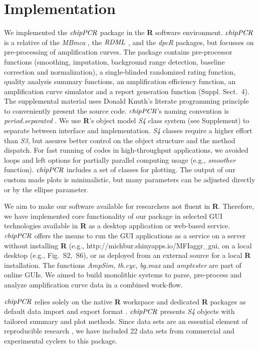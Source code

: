 \documentclass{bioinfo}
\begin{document}
\section{Implementation}
\begin{methods}
We implemented the $\emph{chipPCR}$ package in the \textbf{R} software 
environment. $\emph{chipPCR}$ is a relative of the \emph{MBmca} 
\citep{roediger_RJ_2013}, the $\emph{RDML}$ \citep{roediger_R_2015}, and the 
\emph{dpcR} \citep{pabinger_2014} packages, but focusses on pre-processing of 
amplification curves. The package contains pre-processor functions (smoothing, 
imputation, background range detection, baseline correction and normalization), 
a single-blinded randomized rating function, quality analysis summary functions, 
an amplification efficiency function, an amplification curve simulator
and a report generation function (Suppl. Sect.~4). The supplemental material 
uses Donald Knuth's literate programming principle~\citep{Knuth1984} to 
conveniently present the source code. $\emph{chipPCR}$'s naming convention is 
\textit{period.separated} \citep{Baaaath_2012}. We use \textbf{R}'s object model 
\emph{S4} class system (see Supplement) to separate between interface and 
implementation. \emph{S4} classes require a higher effort than \emph{S3}, but 
assures better control on the object structure and the method dispatch. For fast 
running of codes in high-throughput applications, we avoided loops and left 
options for partially parallel computing usage (e.g., \textsl{smoother} 
function). $\emph{chipPCR}$ includes a set of classes for plotting. The output 
of our custom made plots is minimalistic, but many parameters can be adjusted 
directly or by the ellipse parameter.

We aim to make our software available for researchers not fluent in 
\textbf{R}. Therefore, we have implemented core functionality of our package in 
selected GUI technologies available in \textbf{R} \citep{rodiger_rkward_2012} as a
desktop application or web-based service. $\emph{chipPCR}$ offers the means to run 
the GUI applications as a service on a server without installing \textbf{R} (e.g., 
http://michbur.shinyapps.io/MFIaggr\_gui\), on a local 
desktop (e.g., Fig.~S2,~S6), or as deployed from an external 
source for a local \textbf{R} installation. The functions \textsl{AmpSim}, 
\textsl{th.cyc}, \textsl{bg.max} and \textsl{amptester} are part of online GUIs. 
We aimed to build monolithic systems to parse, pre-process and analyze 
amplification curve data in a combined work-flow. 

$\emph{chipPCR}$ relies solely on the native \textbf{R} 
workspace and dedicated \textbf{R} packages as default data import 
and export format \citep{perkins_2012,roediger_R_2015}. 
$\emph{chipPCR}$ presents \emph{S4} objects with tailored summary and plot 
methods. Since data sets are an essential element of reproducible research 
\citep{Leeper_2014}, we have included 22 data sets from commercial and 
experimental cyclers to this package.
\end{methods}
\end{document}
